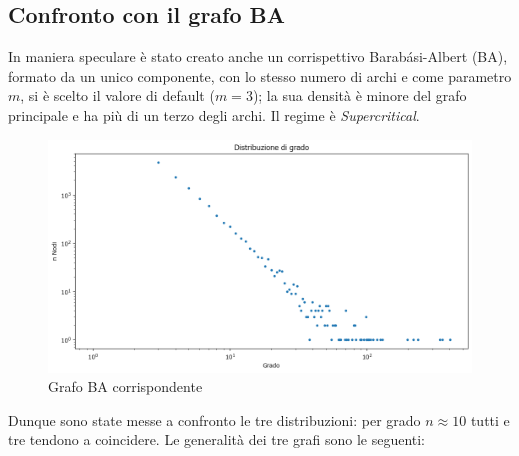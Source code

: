 \documentclass[sigchi]{acmart}
\begin{document}
\subsection{Confronto con il grafo BA}

In maniera speculare è stato creato anche un corrispettivo Barabási-Albert (BA), formato da un unico componente, con lo stesso numero di archi e come parametro $m$, si è scelto il valore di default ($m=3$); la sua densità è minore del grafo principale e ha più di un terzo degli archi. Il regime è {\itshape Supercritical}.

\begin{figure}[H]
\centering
\includegraphics[width=0.45
\textwidth]{../network_analysis/plots/2_2/BAGrDist.png}
\caption{Grafo BA corrispondente}
\label{fig:BAGrDist}
\end{figure}

\noindent Dunque sono state messe a confronto le tre distribuzioni: per grado $n\approx10$ tutti e tre tendono a coincidere. Le generalità dei tre grafi sono le seguenti:

\begin{table}[H]
\centering
\renewcommand{\arraystretch}{1.3}
\caption{Confronto tra le metriche del grafo e dei modelli ER e BA}
\label{tab:comparison}
\end{table}
\end{document}
